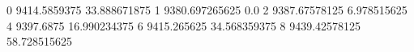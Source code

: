 0 9414.5859375 33.888671875
1 9380.697265625 0.0
2 9387.67578125 6.978515625
4 9397.6875 16.990234375
6 9415.265625 34.568359375
8 9439.42578125 58.728515625
